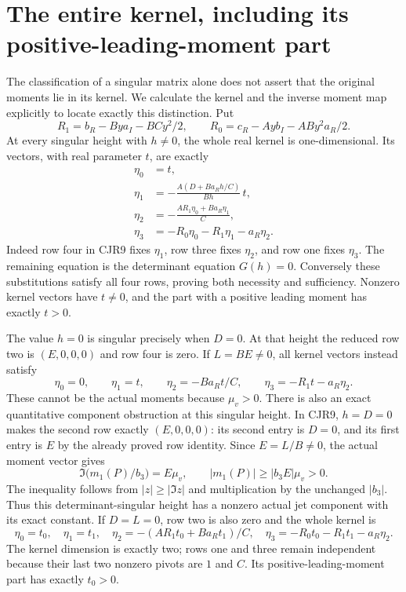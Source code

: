 \section{The entire kernel, including its positive-leading-moment part}
The classification of a singular matrix alone does not assert that
the original moments lie in its kernel. We calculate the kernel and
the inverse moment map explicitly to locate exactly this distinction.
Put
\[
 R_1=b_R-Bya_I-BCy^2/2,\qquad
 R_0=c_R-Ayb_I-ABy^2a_R/2.
 \tag{CJR15}
\]
At every singular height with $h\ne0$, the whole real kernel is
one-dimensional. Its vectors, with real parameter $t$, are exactly
\[
\begin{split}
 \eta_0&=t,\\
 \eta_1&=-\frac{A(D+Ba_Rh/C)}{Bh}\,t,\\
 \eta_2&=-\frac{AR_1\eta_0+Ba_R\eta_1}{C},\\
 \eta_3&=-R_0\eta_0-R_1\eta_1-a_R\eta_2.
\end{split}\tag{CJR16}
\]
Indeed row four in CJR9 fixes $\eta_1$, row three fixes
$\eta_2$, and row one fixes $\eta_3$. The remaining equation is
the determinant equation $G(h)=0$. Conversely these substitutions
satisfy all four rows, proving both necessity and sufficiency.
Nonzero kernel vectors have $t\ne0$, and the part with a positive
leading moment has exactly $t>0$.

The value $h=0$ is singular precisely when $D=0$. At that height
the reduced row two is $(E,0,0,0)$ and row four is zero.
If $L=BE\ne0$, all kernel vectors instead satisfy
\[
 \eta_0=0,\qquad \eta_1=t,\qquad
 \eta_2=-Ba_Rt/C,\qquad
 \eta_3=-R_1t-a_R\eta_2.
 \tag{CJR17}
\]
These cannot be the actual moments because $\mu_v>0$.
There is also an exact quantitative component obstruction at this
singular height. In CJR9, $h=D=0$ makes the second row exactly
$(E,0,0,0)$: its second entry is $D=0$, and its first entry is
$E$ by the already proved row identity. Since $E=L/B\ne0$,
the actual moment vector gives
\[
 \Im\bigl(m_1(P)/b_3\bigr)=E\mu_v,\qquad
 |m_1(P)|\ge |b_3E|\mu_v>0.
 \tag{CJR17a}
\]
The inequality follows from $|z|\ge|\Im z|$ and multiplication
by the unchanged $|b_3|$. Thus this determinant-singular height
has a nonzero actual jet component with its exact constant.
If $D=L=0$, row two is also zero and the whole kernel is
\[
 \eta_0=t_0,\quad \eta_1=t_1,\quad
 \eta_2=-(AR_1t_0+Ba_Rt_1)/C,\quad
 \eta_3=-R_0t_0-R_1t_1-a_R\eta_2.
 \tag{CJR18}
\]
The kernel dimension is exactly two; rows one and three remain
independent because their last two nonzero pivots are $1$ and $C$.
Its positive-leading-moment part has exactly $t_0>0$.

